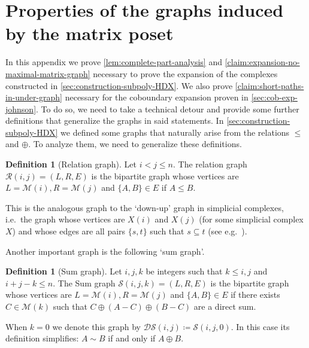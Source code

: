 \documentclass[10pt,a4paper]{article}
\newcommand{\prettyref}[1]{\cref{#1}}
\theoremstyle{definition}
\newtheorem{definition}[theorem]{Definition}
\theoremstyle{remark}
\newcommand{\Authornotecolored}[3]{{\sffamily\small\color{#1}{[#2: #3]}}}
\newcommand{\Authornotecolored}[3]{}
\newcommand{\Ynote}{\Authornotecolored{Purple}{Y}}
\newcommand{\set}[1]{\{#1\}}
\renewcommand{\leq}{\leqslant}
\numberwithin{equation}{section}
\let\pref=\prettyref
\def\MP{\mathcal{M}}
\begin{document}
\section{Properties of the graphs induced by the matrix poset} \label{app:proofs-of-expansion-matrix-graphs}
In this appendix we prove \pref{lem:complete-part-analysis} and \pref{claim:expansion-no-maximal-matrix-graph} necessary to prove the expansion of the complexes constructed in \pref{sec:construction-subpoly-HDX}. We also prove \pref{claim:short-paths-in-under-graph} necessary for the coboundary expansion proven in \pref{sec:cob-exp-johnson}. To do so, we need to take a technical detour and provide some further definitions that generalize the graphs in said statements.
In \pref{sec:construction-subpoly-HDX} we defined some graphs that naturally arise from the relations \(\leq\) and \(\oplus\). To analyze them, we need to generalize these definitions.

\begin{definition}[Relation graph]
    Let \(i < j \leq n\). The relation graph \(\mathcal{R}(i,j) = (L,R,E)\) is the bipartite graph whose vertices are \(L=\MP(i), R=\MP(j)\) and \(\set{A,B} \in E\) if \(A \leq B\).
\end{definition}
This is the analogous graph to the `down-up' graph in simplicial complexes, i.e.\ the graph whose vertices are \(X(i)\) and \(X(j)\) (for some simplicial complex \(X\)) and whose edges are all pairs \(\set{s,t}\) such that \(s \subseteq t\) (see e.g.\ \cite{DinurK2017}).


Another important graph is the following `sum graph'.
\begin{definition}[Sum graph]
    Let \(i,j,k\) be integers such that \(k \leq i,j\) and \(i+j-k \leq n\). The Sum graph \(\mathcal{S}(i,j,k) = (L,R,E)\) is the bipartite graph whose vertices are \(L=\MP(i), R=\MP(j)\) and \(\set{A,B} \in E\) if there exists \(C \in \MP(k)\) such that \(C \oplus (A-C) \oplus (B-C)\) are a direct sum.
\end{definition}
When \(k=0\) we denote this graph by \(\mathcal{DS}(i,j) \coloneqq \mathcal{S}(i,j,0)\). In this case its definition simplifies: \(A \sim B\) if and only if \(A \oplus B\).
\end{document}
